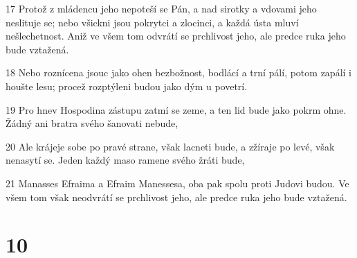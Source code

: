 \par 17 Protož z mládencu jeho nepoteší se Pán, a nad sirotky a vdovami jeho neslituje se; nebo všickni jsou pokrytci a zlocinci, a každá ústa mluví nešlechetnost. Aniž ve všem tom odvrátí se prchlivost jeho, ale predce ruka jeho bude vztažená.
\par 18 Nebo roznícena jsouc jako ohen bezbožnost, bodlácí a trní pálí, potom zapálí i houšte lesu; procež rozptýleni budou jako dým u povetrí.
\par 19 Pro hnev Hospodina zástupu zatmí se zeme, a ten lid bude jako pokrm ohne. Žádný ani bratra svého šanovati nebude,
\par 20 Ale krájeje sobe po pravé strane, však lacneti bude, a zžíraje po levé, však nenasytí se. Jeden každý maso ramene svého žráti bude,
\par 21 Manasses Efraima a Efraim Manessesa, oba pak spolu proti Judovi budou. Ve všem tom však neodvrátí se prchlivost jeho, ale predce ruka jeho bude vztažená.

\chapter{10}

